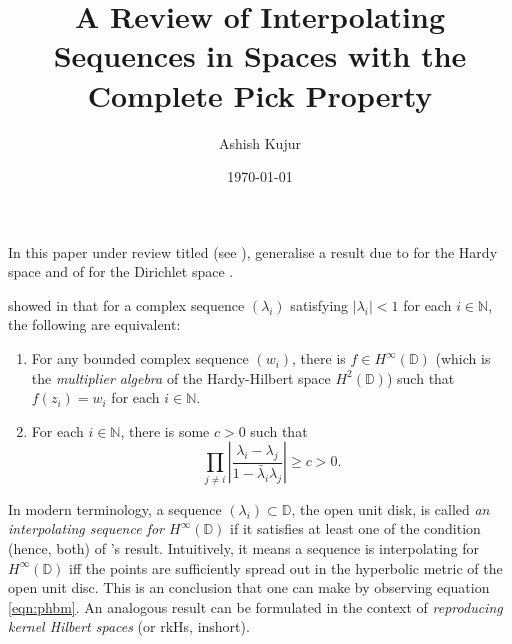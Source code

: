 \documentclass[12pt]{amsart}
\title{A Review of Interpolating Sequences in Spaces with the Complete Pick Property}
\author{Ashish Kujur}
\date{\today}
\theoremstyle{definition}
\numberwithin{equation}{section}
\theoremstyle{remark}
\theoremstyle{plain}
\newcommand{\N}{\mathbb N}
\newcommand{\C}{\mathbb C}
\newcommand{\D}{\mathbb D}
\newcommand{\calH}{{\mathcal H}}
\newcommand{\calM}{{\mathcal M}}
\newcommand{\abs}[1]{\left\lvert #1 \right\rvert}
\begin{document}
\maketitle
In this paper under review titled  (see \cite{zbMATH07130838}), \citeauthor{zbMATH07130838} generalise a result due to \citeauthor{MR0117349} for the Hardy space \cite{MR0117349} and of \citeauthor{Marshall1994InterpolatingSF} for the Dirichlet space \cite{Marshall1994InterpolatingSF}. 


\citeauthor{MR0117349} showed in \cite{MR0117349} that for a complex sequence $\left( \lambda_{i} \right)$ satisfying $\abs{\lambda_{i}} < 1$ for each $i \in \N$, the following are equivalent:
\begin{enumerate}
\item For any bounded complex sequence $\left( w_{i} \right)$, there is $f\in H^{\infty} \left( \D \right)$ (which is the \textit{multiplier algebra} of the Hardy-Hilbert space $H^{2} \left( \D \right)$) such that $f\left( z_{i} \right)=w_{i}$ for each $i\in \N$.
\item For each $i \in \N$, there is some $c > 0$ such that 
\begin{equation}
\prod_{j\ne i} \abs{\frac{\lambda_{i}-\lambda_{j}}{1-\bar \lambda_{i} \lambda_{j}}} \ge c > 0.
\label{eqn:phbm}
\end{equation}
\end{enumerate}
In modern terminology, a sequence $\left( \lambda_{i} \right) \subset \D$, the open unit disk, is called \textit{an interpolating sequence for $H^{\infty} \left( \D \right)$} if it satisfies at least one of the condition (hence, both) of \citeauthor{MR0117349}'s result. Intuitively, it means a sequence is interpolating for $H^{\infty} \left( \D \right)$ iff the points are sufficiently spread out in the hyperbolic metric of the open unit disc. This is an conclusion that one can make by observing equation \ref{eqn:phbm}. An analogous result can be formulated in the context of \textit{reproducing kernel Hilbert spaces} (or rkHs, inshort).
\end{document}
